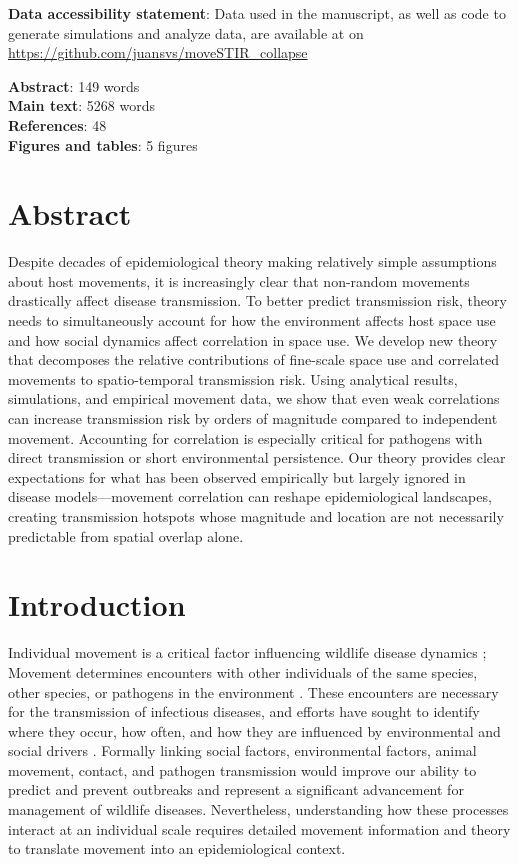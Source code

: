 \documentclass[letterpaper]{article}
\begin{document}
\bigskip
\noindent
\textbf{Data accessibility statement}: Data used in the manuscript, as well as code to generate simulations and analyze data, are available at on \url{https://github.com/juansvs/moveSTIR_collapse}

\bigskip
\noindent
\textbf{Abstract}: 149 words\\
\textbf{Main text}:  5268 words\\
\textbf{References}: 48 \\
\textbf{Figures and tables}: 5 figures \\

\newpage

\doublespacing
\linenumbers

\section*{Abstract}
Despite decades of epidemiological theory making relatively simple assumptions about host movements, it is increasingly clear that non-random movements drastically affect disease transmission. To better predict transmission risk, theory needs to simultaneously account for how the environment affects host space use and how social dynamics affect correlation in space use. We develop new theory that decomposes the relative contributions of fine-scale space use and correlated movements to spatio-temporal transmission risk. Using analytical results, simulations, and empirical movement data, we show that even weak correlations can increase transmission risk by orders of magnitude compared to independent movement. Accounting for correlation is especially critical for pathogens with direct transmission or short environmental persistence. Our theory provides clear expectations for what has been observed empirically but largely ignored in disease models---movement correlation can reshape epidemiological landscapes, creating transmission hotspots whose magnitude and location are not necessarily predictable from spatial overlap alone.

\section*{Introduction}

Individual movement is a critical factor influencing wildlife disease dynamics \citep{Dougherty2018,Manlove2022};
Movement determines encounters with other individuals of the same species, other species, or pathogens in the environment \citep{Martinez-Garcia2020,Das2023}. 
These encounters are necessary for the transmission of infectious diseases, and efforts have sought to identify where they occur, how often, and how they are influenced by environmental and social drivers \citep{Titcomb2021,Dougherty2022,Webber2023}. 
Formally linking social factors, environmental factors, animal movement, contact, and pathogen transmission would improve our ability to predict and prevent outbreaks and represent a significant advancement for management of wildlife diseases.  
Nevertheless, understanding how these processes interact at an individual scale requires detailed movement information and theory to translate movement into an epidemiological context.
\end{document}
